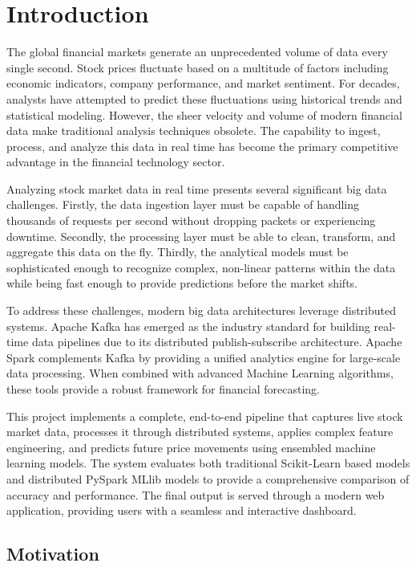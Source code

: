 \documentclass[12pt,a4paper]{report}
\begin{document}
\newpage
{}
\section{Introduction}

The global financial markets generate an unprecedented volume of data every single second. Stock prices fluctuate based on a multitude of factors including economic indicators, company performance, and market sentiment. For decades, analysts have attempted to predict these fluctuations using historical trends and statistical modeling. However, the sheer velocity and volume of modern financial data make traditional analysis techniques obsolete. The capability to ingest, process, and analyze this data in real time has become the primary competitive advantage in the financial technology sector.

Analyzing stock market data in real time presents several significant big data challenges. Firstly, the data ingestion layer must be capable of handling thousands of requests per second without dropping packets or experiencing downtime. Secondly, the processing layer must be able to clean, transform, and aggregate this data on the fly. Thirdly, the analytical models must be sophisticated enough to recognize complex, non-linear patterns within the data while being fast enough to provide predictions before the market shifts. 

To address these challenges, modern big data architectures leverage distributed systems. Apache Kafka has emerged as the industry standard for building real-time data pipelines due to its distributed publish-subscribe architecture. Apache Spark complements Kafka by providing a unified analytics engine for large-scale data processing. When combined with advanced Machine Learning algorithms, these tools provide a robust framework for financial forecasting.

This project implements a complete, end-to-end pipeline that captures live stock market data, processes it through distributed systems, applies complex feature engineering, and predicts future price movements using ensembled machine learning models. The system evaluates both traditional Scikit-Learn based models and distributed PySpark MLlib models to provide a comprehensive comparison of accuracy and performance. The final output is served through a modern web application, providing users with a seamless and interactive dashboard.

\subsection{Motivation}
\end{document}
